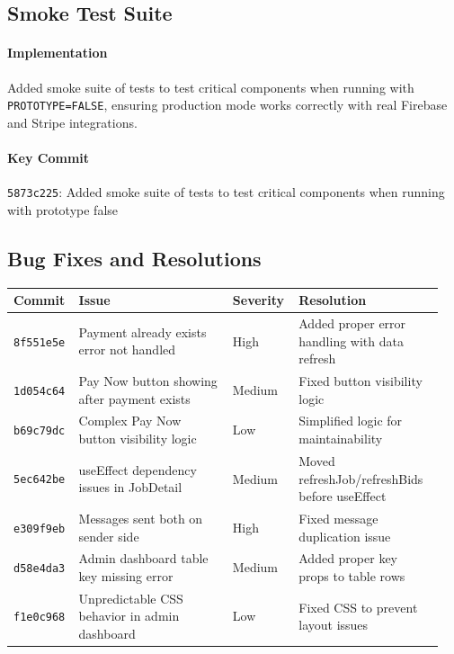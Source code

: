 \documentclass[11pt]{article}
\begin{document}
\subsection{Smoke Test Suite}
\paragraph{Implementation}
Added smoke suite of tests to test critical components when running with \texttt{PROTOTYPE=FALSE}, ensuring production mode works correctly with real Firebase and Stripe integrations.

\paragraph{Key Commit}
\texttt{5873c225}: Added smoke suite of tests to test critical components when running with prototype false

\subsection{Bug Fixes and Resolutions}

\begin{longtable}{@{}p{0.12\linewidth} p{0.35\linewidth} p{0.15\linewidth} p{0.33\linewidth}@{}}
\toprule
\textbf{Commit} & \textbf{Issue} & \textbf{Severity} & \textbf{Resolution} \\
\midrule
\endhead

\texttt{8f551e5e} & Payment already exists error not handled & High & Added proper error handling with data refresh \\
\midrule

\texttt{1d054c64} & Pay Now button showing after payment exists & Medium & Fixed button visibility logic \\
\midrule

\texttt{b69c79dc} & Complex Pay Now button visibility logic & Low & Simplified logic for maintainability \\
\midrule

\texttt{5ec642be} & useEffect dependency issues in JobDetail & Medium & Moved refreshJob/refreshBids before useEffect \\
\midrule

\texttt{e309f9eb} & Messages sent both on sender side & High & Fixed message duplication issue \\
\midrule

\texttt{d58e4da3} & Admin dashboard table key missing error & Medium & Added proper key props to table rows \\
\midrule

\texttt{f1e0c968} & Unpredictable CSS behavior in admin dashboard & Low & Fixed CSS to prevent layout issues \\
\bottomrule
\end{longtable}
\end{document}
